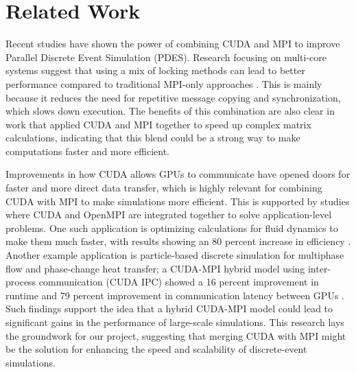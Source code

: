 \documentclass[11pt]{article}
\begin{document}
\section {Related Work}\label{rel}



Recent studies have shown the power of combining CUDA and MPI to improve Parallel Discrete Event Simulation (PDES). Research focusing on multi-core systems suggest that using a mix of locking methods can lead to better performance compared to traditional MPI-only approaches \cite{Wang:PDES}. This is mainly because it reduces the need for repetitive message copying and synchronization, which slows down execution. The benefits of this combination are also clear in work that applied CUDA and MPI together to speed up complex matrix calculations, indicating that this blend could be a strong way to make computations faster and more efficient.

Improvements in how CUDA allows GPUs to communicate have opened doors for faster and more direct data transfer, which is highly relevant for combining CUDA with MPI to make simulations more efficient. This is supported by studies where CUDA and OpenMPI are integrated together to solve application-level problems. One such application is optimizing calculations for fluid dynamics to make them much faster, with results showing an 80 percent increase in efficiency \cite{Delmas:WaterFlow}. Another example application is particle-based discrete simulation for multiphase flow and phase-change heat transfer; a CUDA-MPI hybrid model using inter-process communication (CUDA IPC) showed a 16 percent improvement in runtime and 79 percent improvement in communication latency between GPUs \cite{Potluri:CUDAIPC}. Such findings support the idea that a hybrid CUDA-MPI model could lead to significant gains in the performance of large-scale simulations. This research lays the groundwork for our project, suggesting that merging CUDA with MPI might be the solution for enhancing the speed and scalability of discrete-event simulations.
\end{document}
